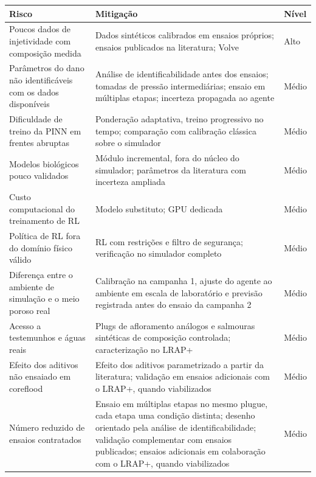 \documentclass[10pt,a4paper]{article}
\begin{document}
{\small{}
\begin{longtable}{@{}>{\raggedright\arraybackslash}p{}>{\raggedright\arraybackslash}p{}>{\raggedright\arraybackslash}p{}@{}}
\toprule
\textbf{Risco} & \textbf{Mitigação} & \textbf{Nível} \\
\midrule
\endhead
Poucos dados de injetividade com composição medida & Dados sintéticos calibrados em ensaios próprios; ensaios publicados na literatura; Volve & Alto \\
Parâmetros do dano não identificáveis com os dados disponíveis & Análise de identificabilidade antes dos ensaios; tomadas de pressão intermediárias; ensaio em múltiplas etapas; incerteza propagada ao agente & Médio \\
Dificuldade de treino da PINN em frentes abruptas & Ponderação adaptativa, treino progressivo no tempo; comparação com calibração clássica sobre o simulador & Médio \\
Modelos biológicos pouco validados & Módulo incremental, fora do núcleo do simulador; parâmetros da literatura com incerteza ampliada & Médio \\
Custo computacional do treinamento de RL & Modelo substituto; GPU dedicada & Médio \\
Política de RL fora do domínio físico válido & RL com restrições e filtro de segurança; verificação no simulador completo & Médio \\
Diferença entre o ambiente de simulação e o meio poroso real & Calibração na campanha 1, ajuste do agente ao ambiente em escala de laboratório e previsão registrada antes do ensaio da campanha 2 & Médio \\
Acesso a testemunhos e águas reais & Plugs de afloramento análogos e salmouras sintéticas de composição controlada; caracterização no LRAP+ & Médio \\
Efeito dos aditivos não ensaiado em coreflood & Efeito dos aditivos parametrizado a partir da literatura; validação em ensaios adicionais com o LRAP+, quando viabilizados & Médio \\
Número reduzido de ensaios contratados & Ensaio em múltiplas etapas no mesmo plugue, cada etapa uma condição distinta; desenho orientado pela análise de identificabilidade; validação complementar com ensaios publicados; ensaios adicionais em colaboração com o LRAP+, quando viabilizados & Médio \\\bottomrule
\end{longtable}
}
\end{document}
